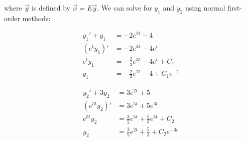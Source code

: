 \documentclass{ximera}
\begin{document}
\begin{exampleSol}
\begin{enumerate}
\begin{equation*}
            \end{equation*} where $\vec{y}$ is defined by $\vec{x} = E\vec{y}$. We can solve for $y_1$ and $y_2$ using normal first-order methods:
            \begin{minipage}{0.49\textwidth}
                \begin{equation*}
                    \begin{split}
                        y_1' + y_1 &= -2e^{2t} - 4 \\ 
                        (e^t y_1)' &= -2e^{3t} - 4e^t \\
                        e^t y_1 &= -\frac{2}{3}e^{3t} - 4e^{t} + C_1 \\
                        y_1 &= -\frac{2}{3}e^{2t} - 4 + C_1e^{-t} 
                    \end{split}
                \end{equation*}
            \end{minipage}
            \begin{minipage}{0.49\textwidth}
                \begin{equation*}
                    \begin{split}
                        y_2' + 3y_2 &= 3e^{2t} + 5 \\ 
                        (e^{3t} y_2)' &= 3e^{5t} + 5e^{3t} \\
                        e^{3t} y_2 &= \frac{3}{5}e^{5t} + \frac{5}{3}e^{3t} + C_2 \\
                        y_2 &= \frac{3}{5}e^{2t} + \frac{5}{3} + C_2e^{-3t}
                    \end{split}
                \end{equation*}
            \end{minipage}
            

\end{enumerate}
\end{exampleSol}
\end{document}

